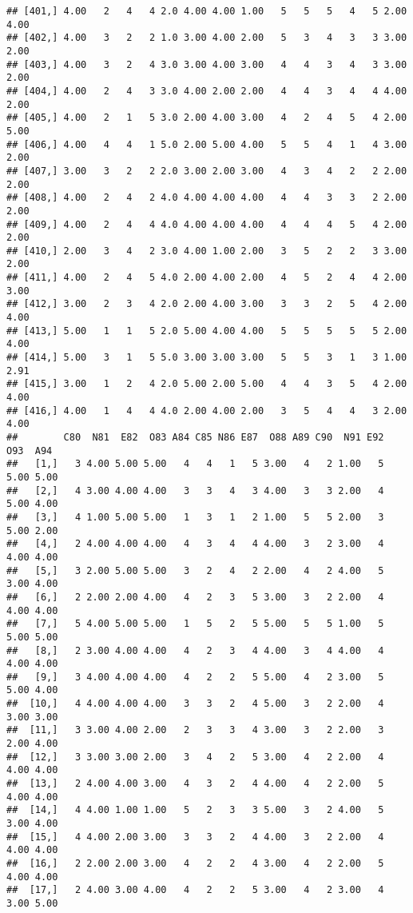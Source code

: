 \documentclass[]{article}
\begin{document}
\begin{verbatim}
## [401,] 4.00   2   4   4 2.0 4.00 4.00 1.00   5   5   5   4   5 2.00 4.00
## [402,] 4.00   3   2   2 1.0 3.00 4.00 2.00   5   3   4   3   3 3.00 2.00
## [403,] 4.00   3   2   4 3.0 3.00 4.00 3.00   4   4   3   4   3 3.00 2.00
## [404,] 4.00   2   4   3 3.0 4.00 2.00 2.00   4   4   3   4   4 4.00 2.00
## [405,] 4.00   2   1   5 3.0 2.00 4.00 3.00   4   2   4   5   4 2.00 5.00
## [406,] 4.00   4   4   1 5.0 2.00 5.00 4.00   5   5   4   1   4 3.00 2.00
## [407,] 3.00   3   2   2 2.0 3.00 2.00 3.00   4   3   4   2   2 2.00 2.00
## [408,] 4.00   2   4   2 4.0 4.00 4.00 4.00   4   4   3   3   2 2.00 2.00
## [409,] 4.00   2   4   4 4.0 4.00 4.00 4.00   4   4   4   5   4 2.00 2.00
## [410,] 2.00   3   4   2 3.0 4.00 1.00 2.00   3   5   2   2   3 3.00 2.00
## [411,] 4.00   2   4   5 4.0 2.00 4.00 2.00   4   5   2   4   4 2.00 3.00
## [412,] 3.00   2   3   4 2.0 2.00 4.00 3.00   3   3   2   5   4 2.00 4.00
## [413,] 5.00   1   1   5 2.0 5.00 4.00 4.00   5   5   5   5   5 2.00 4.00
## [414,] 5.00   3   1   5 5.0 3.00 3.00 3.00   5   5   3   1   3 1.00 2.91
## [415,] 3.00   1   2   4 2.0 5.00 2.00 5.00   4   4   3   5   4 2.00 4.00
## [416,] 4.00   1   4   4 4.0 2.00 4.00 2.00   3   5   4   4   3 2.00 4.00
##        C80  N81  E82  O83 A84 C85 N86 E87  O88 A89 C90  N91 E92  O93  A94
##   [1,]   3 4.00 5.00 5.00   4   4   1   5 3.00   4   2 1.00   5 5.00 5.00
##   [2,]   4 3.00 4.00 4.00   3   3   4   3 4.00   3   3 2.00   4 5.00 4.00
##   [3,]   4 1.00 5.00 5.00   1   3   1   2 1.00   5   5 2.00   3 5.00 2.00
##   [4,]   2 4.00 4.00 4.00   4   3   4   4 4.00   3   2 3.00   4 4.00 4.00
##   [5,]   3 2.00 5.00 5.00   3   2   4   2 2.00   4   2 4.00   5 3.00 4.00
##   [6,]   2 2.00 2.00 4.00   4   2   3   5 3.00   3   2 2.00   4 4.00 4.00
##   [7,]   5 4.00 5.00 5.00   1   5   2   5 5.00   5   5 1.00   5 5.00 5.00
##   [8,]   2 3.00 4.00 4.00   4   2   3   4 4.00   3   4 4.00   4 4.00 4.00
##   [9,]   3 4.00 4.00 4.00   4   2   2   5 5.00   4   2 3.00   5 5.00 4.00
##  [10,]   4 4.00 4.00 4.00   3   3   2   4 5.00   3   2 2.00   4 3.00 3.00
##  [11,]   3 3.00 4.00 2.00   2   3   3   4 3.00   3   2 2.00   3 2.00 4.00
##  [12,]   3 3.00 3.00 2.00   3   4   2   5 3.00   4   2 2.00   4 4.00 4.00
##  [13,]   2 4.00 4.00 3.00   4   3   2   4 4.00   4   2 2.00   5 4.00 4.00
##  [14,]   4 4.00 1.00 1.00   5   2   3   3 5.00   3   2 4.00   5 3.00 4.00
##  [15,]   4 4.00 2.00 3.00   3   3   2   4 4.00   3   2 2.00   4 4.00 4.00
##  [16,]   2 2.00 2.00 3.00   4   2   2   4 3.00   4   2 2.00   5 4.00 4.00
##  [17,]   2 4.00 3.00 4.00   4   2   2   5 3.00   4   2 3.00   4 3.00 5.00

\end{verbatim}
\end{document}
